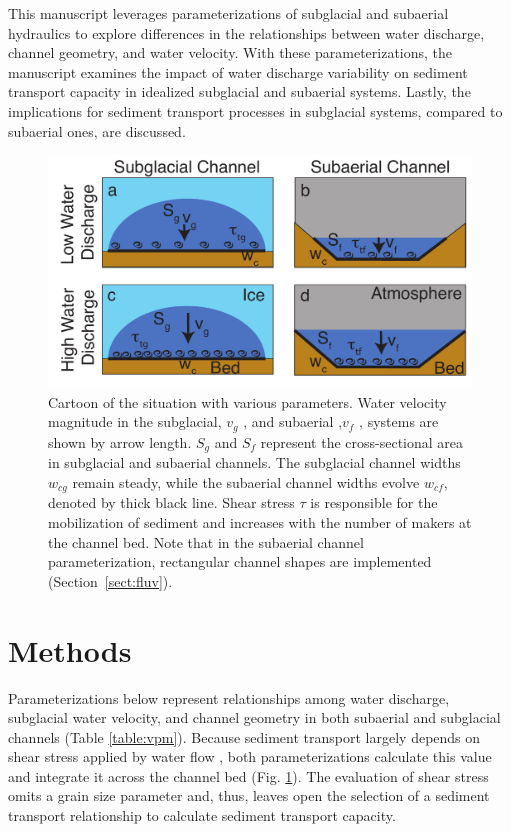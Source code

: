\documentclass[11pt]{article}
\begin{document}
\begin{spacing}{1}
  This manuscript leverages parameterizations of subglacial and subaerial hydraulics to explore differences in the relationships between  water discharge, channel geometry, and water velocity. 
  With these parameterizations, the manuscript examines the impact of water discharge variability on sediment transport capacity in idealized subglacial and subaerial systems.
  Lastly, the implications for sediment transport processes in subglacial systems, compared to subaerial ones, are discussed.
  
  \begin{center}
    \begin{figure}[H]
      \includegraphics[width=0.65\linewidth]{Cartoon.pdf}
      \caption{Cartoon of the situation with various parameters. Water velocity magnitude in the subglacial, $v_g$ , and subaerial ,$v_f$ , systems are shown by arrow length. $S_g$ and $S_f$ represent the cross-sectional area in subglacial and subaerial channels. The subglacial channel widths $w_{cg}$ remain steady, while the subaerial channel widths evolve $w_{cf}$, denoted by thick black line. Shear stress $\tau$ is responsible for the mobilization of sediment and increases with the number of makers at the channel bed. 
        Note that in the subaerial channel parameterization, rectangular channel shapes are implemented (Section~\ref{sect:fluv}).} 
      \label{fig:cartoon}
    \end{figure}
  \end{center}


  
  \section{Methods}
  \label{sect:meth}
    Parameterizations below represent relationships among water discharge, subglacial water velocity, and channel geometry in both subaerial and subglacial channels (Table \ref{table:vpm}).
  Because sediment transport largely depends on shear stress applied by water flow \citep{shields1936}, both parameterizations calculate this value and integrate  it across the channel bed (Fig. \ref{fig:cartoon}).
  The evaluation of shear stress  omits a grain size parameter and, thus, leaves open the selection of a sediment transport relationship  \citep[e.g.][]{shields1936,meyer1948} to  calculate sediment transport capacity.


\end{spacing}
\end{document}
